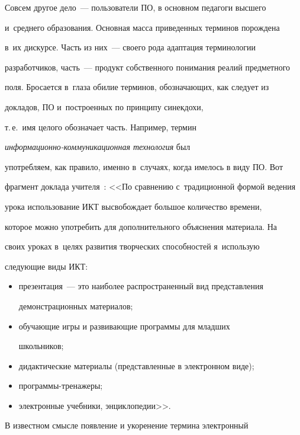   Совсем другое дело~--- пользователи ПО, в основном педагоги высшего

и~среднего образования. Основная масса приведенных терминов порождена

в~их дискурсе. Часть из них~--- своего рода адаптация терминологии

разработчиков, часть~--- продукт собственного понимания реалий предметного

поля. Бросается в~глаза обилие терминов, обозначающих, как следует из

докладов, ПО и~построенных по принципу синекдохи,

т.\,е.\ имя целого обозначает часть. Например, термин

  \textit{информационно-коммуникационная технология}  был

упо\-треб\-ля\-ем, как правило, именно в~случаях, когда имелось в виду ПО. Вот

фрагмент доклада учителя~\cite[с.~110]{10-vik}: <<По сравнению с~традиционной формой ведения

урока использование ИКТ высвобождает большое количество времени,

которое можно употребить для дополнительного объяснения материала. На

своих уроках в~целях развития творческих способностей я~использую

следующие виды ИКТ:

  \begin{itemize}

\item презентация~--- это наиболее распространенный вид представления

демонстрационных материалов;

\item обучающие игры и развивающие программы для младших

школьников;

\item дидактические материалы (представленные в электронном виде);

\item программы-тренажеры;

\item электронные учебники, энциклопедии>>.

\end{itemize}



  В известном смысле появление и укоренение термина электронный

